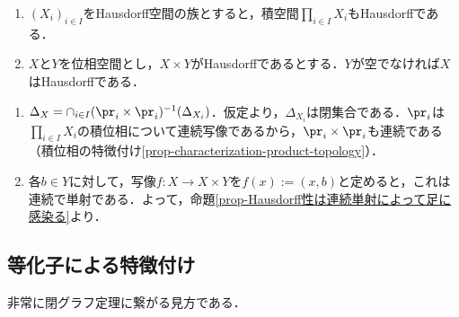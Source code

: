 \documentclass[uplatex,dvipdfmx]{jsreport}
\begin{document}
\begin{corollary}[直積へのHausdorff性の伝播]\mbox{}
    \begin{enumerate}
        \item $(X_i)_{i\in I}$をHausdorff空間の族とすると，積空間$\prod_{i\in I}X_i$もHausdorffである．
        \item $X$と$Y$を位相空間とし，$X\times Y$がHausdorffであるとする．$Y$が空でなければ$X$はHausdorffである．
    \end{enumerate}
\end{corollary}
\begin{Proof}\mbox{}
    \begin{enumerate}
        \item $\Delta_X=\cap_{i\in I}(\pr_i\times\pr_i)^{-1}(\Delta_{X_i})$．仮定より，$\Delta_{X_i}$は閉集合である．$\pr_i$は$\prod_{i\in I}X_i$の積位相について連続写像であるから，$\pr_i\times\pr_i$も連続である（積位相の特徴付け\ref{prop-characterization-product-topology}）．
        \item 各$b\in Y$に対して，写像$f:X\to X\times Y$を$f(x):=(x,b)$と定めると，これは連続で単射である．よって，命題\ref{prop-Hausdorff性は連続単射によって足に感染る}より．
    \end{enumerate}
\end{Proof}

\subsection{等化子による特徴付け}

\begin{tcolorbox}[colframe=ForestGreen, colback=ForestGreen!10!white,breakable,colbacktitle=ForestGreen!40!white,coltitle=black,fonttitle=\bfseries\sffamily,
title=]
    非常に閉グラフ定理に繋がる見方である．
\end{tcolorbox}
\end{document}
